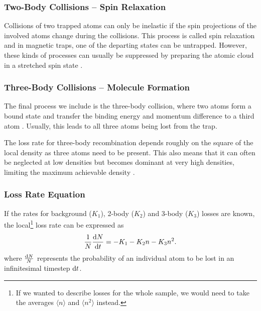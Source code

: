 \subsubsection*{Two-Body Collisions -- Spin Relaxation} 
Collisions of two trapped atoms can only be inelastic if the spin projections of the involved atoms change during the collisions. 
This process is called spin relaxation and in magnetic traps, one of the departing states can be untrapped. However, these kinds of processes can usually be suppressed by preparing the atomic cloud in a stretched spin state \cite{PhysRevLett.99.223201}.

\subsubsection*{Three-Body Collisions -- Molecule Formation}
The final process we include is the three-body collision, where two atoms form a bound state and transfer the binding energy and momentum difference to a third atom \cite{PhysRevLett.91.123201}. Usually, this leads to all three atoms being lost from the trap.

The loss rate for three-body recombination depends roughly on the square of the local density as three atoms need to be present. This also means that it can often be neglected at low densities but becomes dominant at very high densities, limiting the maximum achievable density \cite{PhysRevA.85.053647}.

\subsubsection*{Loss Rate Equation}
If the rates for background ($K_1$), 2-body ($K_2$) and 3-body ($K_3$) losses are known, the local\footnote{If we wanted to describe losses for the whole sample, we would need to take the averages $\langle n\rangle$ and $\langle n^2 \rangle$ instead.} loss rate can be expressed as
\begin{align} \label{eq:lossrate}
    \frac{1}{N}\frac{\text{d}N}{\text{d}t} = - K_1 - K_2 n - K_3 n^2.
\end{align}
where $\frac{\text{d}N}{N}$ represents the probability of an individual atom to be lost in an infinitesimal timestep $\text{d}t$.




